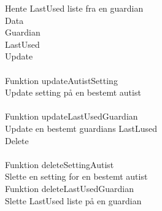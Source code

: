 Hente LastUsed liste fra en guardian\\
Data\\
Guardian\\
LastUsed\\
Update\\
\\
Funktion updateAutistSetting\\
Update setting p\aa{} en bestemt autist\\
\\
Funktion updateLastUsedGuardian\\
Update en bestemt guardians LastLused \\
Delete\\
\\
Funktion deleteSettingAutist\\
Slette en setting for en bestemt autist\\
Funktion deleteLastUsedGuardian\\
Slette LastUsed liste p\aa{} en guardian\\